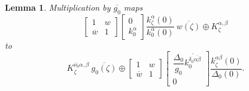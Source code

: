 \documentclass[10pt,a4paper]{amsart}
\newtheorem{lemma}{Lemma}
\def\D{\Delta}
\def\a{\alpha}
\def\b{\beta}
\def\d{\delta}
\newcommand{\z}{\zeta}
\begin{document}
\begin{lemma}
Multiplication by $\overline{g_0}$ maps
$$
\begin{bmatrix}
1 & w \\
\overline{w} & 1
\end{bmatrix}
\begin{bmatrix}
0
\\
k^\a_0
\end{bmatrix}
\dfrac{k^\a_\z(0)}{k^\a_0(0)}
\ \overline{w(\zeta)}
\oplus
K_{\zeta}^{\alpha, \beta}
$$
to
$$
K_{\zeta}^{\overline{\nu_0}\alpha, \beta}
\ \overline{g_0(\z)}
\oplus
\begin{bmatrix}
1 & w \\
\overline{w} & 1
\end{bmatrix}
\begin{bmatrix}
\dfrac{\D_0}{g_0}\overline{k^{\d_0\overline{\alpha\b}}_0}
\\
0
\end{bmatrix}
\dfrac{k^{\a\b}_\z(0)}{\D_0(0)}
.
$$
\end{lemma}
\end{document}
